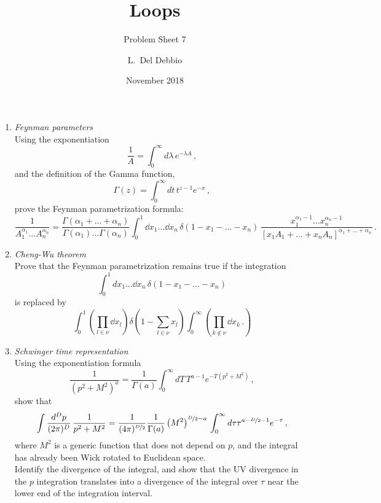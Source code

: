 \documentclass{tutorial}
\subtitle{Problem Sheet 7}
\title{Loops}
\author{L.~Del Debbio}
\date{November 2018}
\begin{document}
\maketitle

\begin{enumerate}
\item \emph{ Feynman parameters} \\

  Using the exponentiation
  \[
    \frac{1}{A} = \int_0^\infty d\lambda\, e^{-\lambda A}\, ,
  \]
  and the definition of the Gamma function,
  \[
    \Gamma(z) = \int_0^\infty dt\, t^{z-1} e^{-x}\, ,
  \]
  prove the Feynman parametrization formula:
  \[
    \frac{1}{A_1^{\alpha_1} \ldots A_n^{\alpha_n}} =
    \frac{\Gamma(\alpha_1+\ldots+\alpha_n)}{\Gamma(\alpha_1) \ldots
      \Gamma(\alpha_n)} \int_0^1\dd{x_1} \ldots \dd{x_n}\,
    \delta(1-x_1-\ldots -x_n)\,
    \frac{x_1^{\alpha_1-1} \ldots x_n^{\alpha_n-1}}{\left[x_1 A_1 +
        \ldots + x_n A_n\right]^{\alpha_1+\ldots +\alpha_n}}\, .
  \]

  \bigskip
  
\item \emph{ Cheng-Wu theorem}\\

  Prove that the Feynman parametrization remains true if the
  integration
  \[
    \int_0^1dx_1 \ldots \dd{x_n}\,
    \delta(1-x_1-\ldots -x_n)
  \]
  is replaced by
  \[
    \int_0^1 \left(\prod_{l\in\nu} \dd{x_l}\right)
    \delta\left(1-\sum_{l\in\nu}x_l\right)
    \int_0^\infty \left(
      \prod_{k\not\in\nu}\dd{x_k}\, .
    \right)
  \]

  \bigskip

\item \emph{ Schwinger time representation}\\

  Using the exponentiation formula
  \[
    \frac{1}{(p^2+M^2)^a} = \frac{1}{\Gamma(a)} \int_0^\infty dT\,
    T^{a-1} e^{-T (p^2+M^2)}\, ,
  \]
  show that
  \[
    \int \frac{d^Dp}{(2\pi)^D}\, \frac{1}{p^2+M^2} =
    \frac{1}{(4\pi)^{\nicefrac{D}{2}}}  \frac{1}{\Gamma(a)} \left(M^2\right)^{\nicefrac{D}{2}-a}\, \int_0^\infty
    d\tau \tau^{a-\nicefrac{D}{2}-1} e^{-\tau}\, ,
  \]
  where $M^2$ is a generic function that does not depend on $p$, and
  the integral has already been Wick rotated to Euclidean space. \\

  Identify the divergence of the integral, and show that the UV
  divergence in the $p$ integration translates into a divergence of
  the integral over $\tau$ near the lower end of the integration
  interval. \\


\end{enumerate}
\end{document}
